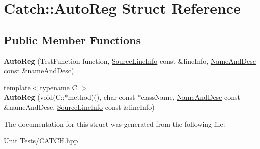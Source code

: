 \hypertarget{structCatch_1_1AutoReg}{}\section{Catch\+:\+:Auto\+Reg Struct Reference}
\label{structCatch_1_1AutoReg}
\subsection*{Public Member Functions}
\begin{DoxyCompactItemize}
\item 
{\bfseries Auto\+Reg} (Test\+Function function, \hyperlink{structCatch_1_1SourceLineInfo}{Source\+Line\+Info} const \&line\+Info, \hyperlink{structCatch_1_1NameAndDesc}{Name\+And\+Desc} const \&name\+And\+Desc)\hypertarget{structCatch_1_1AutoReg_af224f4568d57b8652474df475a164a8c}{}\label{structCatch_1_1AutoReg_af224f4568d57b8652474df475a164a8c}

\item 
{\footnotesize template$<$typename C $>$ }\\{\bfseries Auto\+Reg} (void(C\+::$\ast$method)(), char const $\ast$class\+Name, \hyperlink{structCatch_1_1NameAndDesc}{Name\+And\+Desc} const \&name\+And\+Desc, \hyperlink{structCatch_1_1SourceLineInfo}{Source\+Line\+Info} const \&line\+Info)\hypertarget{structCatch_1_1AutoReg_a1bf9207fe0a02b46dc0ab1cc03cbe738}{}\label{structCatch_1_1AutoReg_a1bf9207fe0a02b46dc0ab1cc03cbe738}

\end{DoxyCompactItemize}


The documentation for this struct was generated from the following file\+:\begin{DoxyCompactItemize}
\item 
Unit Tests/C\+A\+T\+C\+H.\+hpp\end{DoxyCompactItemize}
